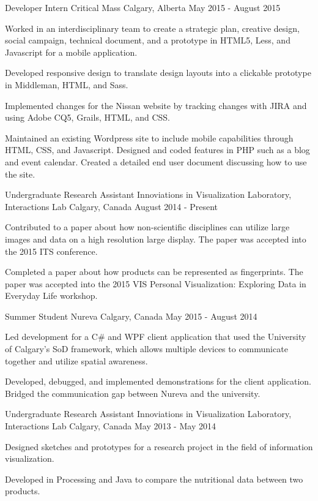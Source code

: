 \begin{cventries}
  \cventry
    {Developer Intern}
    {Critical Mass}
    {Calgary, Alberta}
    {May 2015 - August 2015}
    {
      \begin{cvitems}
        \item {Worked in an interdisciplinary team to create a strategic plan, creative design, social campaign, technical document, and a prototype in HTML5, Less, and Javascript for a mobile application.}
        \item {Developed responsive design to translate design layouts into a clickable prototype in Middleman, HTML, and Sass.}
        \item {Implemented changes for the Nissan website by tracking changes with JIRA and using Adobe CQ5, Grails, HTML, and CSS.}
        \item {Maintained an existing Wordpress site to include mobile capabilities through HTML, CSS, and Javascript. Designed and coded features in PHP such as a blog and event calendar. Created a detailed end user document discussing how to use the site.}
      \end{cvitems}
    }
  \cventry
    {Undergraduate Research Assistant}
    {Innoviations in Visualization Laboratory, Interactions Lab}
    {Calgary, Canada}
    {August 2014 - Present}
    {
      \begin{cvitems}
        \item {Contributed to a paper about how non-scientific disciplines can utilize large images and data on a high resolution large display. The paper was accepted into the 2015 ITS conference.}
        \item {Completed a paper about how products can be represented as fingerprints. The paper was accepted into the 2015 VIS Personal Visualization: Exploring Data in Everyday Life workshop.}
      \end{cvitems}
    }
  \cventry
    {Summer Student}
    {Nureva}
    {Calgary, Canada}
    {May 2015 - August 2014}
    {
      \begin{cvitems}
        \item {Led development for a C\# and WPF client application that used the University of Calgary’s SoD framework, which allows multiple devices to communicate together and utilize spatial awareness.}
        \item {Developed, debugged, and implemented demonstrations for the client application. Bridged the communication gap between Nureva and the university.}
      \end{cvitems}  
    }
  \cventry
    {Undergraduate Research Assistant}
    {Innoviations in Visualization Laboratory, Interactions Lab}
    {Calgary, Canada}
    {May 2013 - May 2014}
    {
      \begin{cvitems}
        \item {Designed sketches and prototypes for a research project in the field of information visualization.}
        \item {Developed in Processing and Java to compare the nutritional data between two products.}
      \end{cvitems}
    }
\end{cventries}
